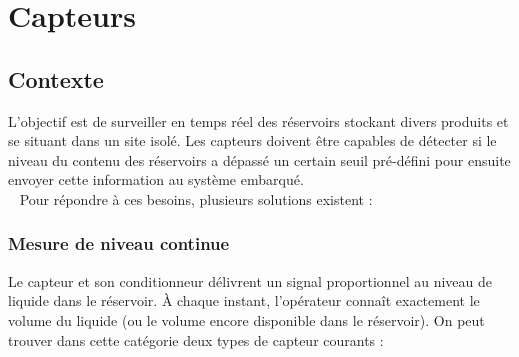 \section {Capteurs}

\subsection {Contexte} 
L’objectif est de surveiller en temps réel des réservoirs stockant divers produits et se situant dans un site isolé. Les capteurs doivent être capables de détecter si le niveau du contenu des réservoirs a dépassé un certain seuil pré-défini pour ensuite envoyer cette information au système embarqué. \\~
Pour répondre à ces besoins, plusieurs solutions existent : 

	\subsubsection {Mesure de niveau continue}
 	Le capteur et son conditionneur délivrent un signal proportionnel au niveau de liquide dans le réservoir. À chaque instant, l'opérateur connaît exactement le volume du liquide (ou le volume encore disponible dans le réservoir).  On peut trouver dans cette catégorie deux types de capteur  courants : 
